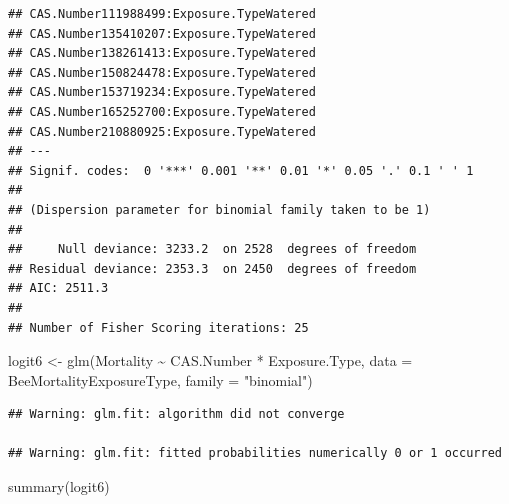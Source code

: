 \documentclass[
  12pt,
]{article}
\newenvironment{Shaded}{\begin{snugshade}}{\end{snugshade}}
\newcommand{\AttributeTok}[1]{\textcolor[rgb]{0.77,0.63,0.00}{#1}}
\newcommand{\FunctionTok}[1]{\textcolor[rgb]{0.00,0.00,0.00}{#1}}
\newcommand{\NormalTok}[1]{#1}
\newcommand{\OtherTok}[1]{\textcolor[rgb]{0.56,0.35,0.01}{#1}}
\newcommand{\SpecialCharTok}[1]{\textcolor[rgb]{0.00,0.00,0.00}{#1}}
\newcommand{\StringTok}[1]{\textcolor[rgb]{0.31,0.60,0.02}{#1}}
\begin{document}
\begin{verbatim}
## CAS.Number111988499:Exposure.TypeWatered                                           
## CAS.Number135410207:Exposure.TypeWatered                                           
## CAS.Number138261413:Exposure.TypeWatered                                           
## CAS.Number150824478:Exposure.TypeWatered                                           
## CAS.Number153719234:Exposure.TypeWatered                                           
## CAS.Number165252700:Exposure.TypeWatered                                           
## CAS.Number210880925:Exposure.TypeWatered                                           
## ---
## Signif. codes:  0 '***' 0.001 '**' 0.01 '*' 0.05 '.' 0.1 ' ' 1
## 
## (Dispersion parameter for binomial family taken to be 1)
## 
##     Null deviance: 3233.2  on 2528  degrees of freedom
## Residual deviance: 2353.3  on 2450  degrees of freedom
## AIC: 2511.3
## 
## Number of Fisher Scoring iterations: 25
\end{verbatim}

\begin{Shaded}
\begin{Highlighting}[]
\NormalTok{logit6 }\OtherTok{\textless{}{-}} \FunctionTok{glm}\NormalTok{(Mortality }\SpecialCharTok{\textasciitilde{}}\NormalTok{ CAS.Number }\SpecialCharTok{*}\NormalTok{ Exposure.Type, }\AttributeTok{data =}\NormalTok{ BeeMortalityExposureType, }\AttributeTok{family =} \StringTok{"binomial"}\NormalTok{)}
\end{Highlighting}
\end{Shaded}

\begin{verbatim}
## Warning: glm.fit: algorithm did not converge

## Warning: glm.fit: fitted probabilities numerically 0 or 1 occurred
\end{verbatim}

\begin{Shaded}
\begin{Highlighting}[]
\FunctionTok{summary}\NormalTok{(logit6)}
\end{Highlighting}
\end{Shaded}
\end{document}
